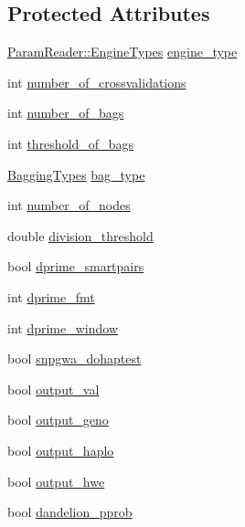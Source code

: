 \subsection*{Protected Attributes}
\begin{DoxyCompactItemize}
\item 
\hyperlink{classParamReader_ade771142042ad0251f905f38248ae9df}{ParamReader::EngineTypes} \hyperlink{classEngineParamReader_a7e6ea61924214939032fdbce1ecba651}{engine\_\-type}
\item 
int \hyperlink{classEngineParamReader_ae664f1cefdf1bfbb3fb93d3dcacac822}{number\_\-of\_\-crossvalidations}
\item 
int \hyperlink{classEngineParamReader_ade5d84964b6eebdb2a0efb86db6d5486}{number\_\-of\_\-bags}
\item 
int \hyperlink{classEngineParamReader_ad071b31418cfeeb13b015064bf3714b0}{threshold\_\-of\_\-bags}
\item 
\hyperlink{classEngineParamReader_ab2ee80aa67ba657beddf852c526e1a3d}{BaggingTypes} \hyperlink{classEngineParamReader_aa014c5a4566d1732eb0a14435330f379}{bag\_\-type}
\item 
int \hyperlink{classEngineParamReader_ac1054fd8623de4a86d2a1cf4085628c0}{number\_\-of\_\-nodes}
\item 
double \hyperlink{classEngineParamReader_a9b18c388f784d057fc284be2f372bb1e}{division\_\-threshold}
\item 
bool \hyperlink{classEngineParamReader_acb567723678ce125c1b29070aadcebf8}{dprime\_\-smartpairs}
\item 
int \hyperlink{classEngineParamReader_aa5e874ef2077ba99e90ab42f13049dc7}{dprime\_\-fmt}
\item 
int \hyperlink{classEngineParamReader_a0b24a93f84519a2392fbaab16b6bc82a}{dprime\_\-window}
\item 
bool \hyperlink{classEngineParamReader_ac782b98dc9c201d73458b3ae6c5a53e6}{snpgwa\_\-dohaptest}
\item 
bool \hyperlink{classEngineParamReader_adfad9c1511ba0932828906285b9a022d}{output\_\-val}
\item 
bool \hyperlink{classEngineParamReader_af1d4d68b8561127a5134090ebaedee56}{output\_\-geno}
\item 
bool \hyperlink{classEngineParamReader_a7747cc0a7bc3dbe11dea0df50349a2cc}{output\_\-haplo}
\item 
bool \hyperlink{classEngineParamReader_ad5357c75728cd53b4d6927e1d119b8c3}{output\_\-hwe}
\item 
bool \hyperlink{classEngineParamReader_ac352d87f0967d442b9d1e76757b7aab9}{dandelion\_\-pprob}

\end{DoxyCompactItemize}
